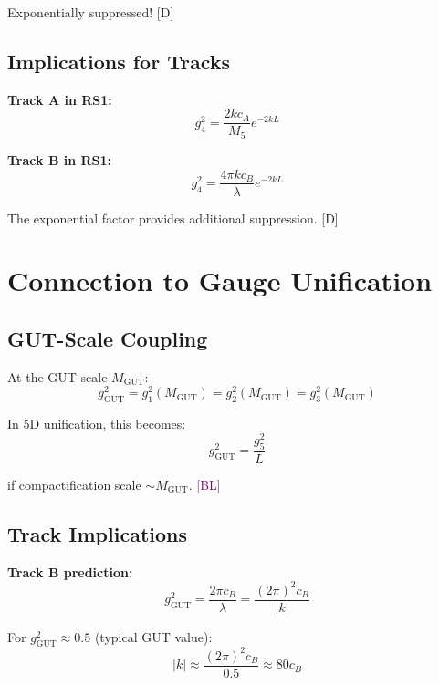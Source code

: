\documentclass[11pt,a4paper]{article}
\newcommand{\tagD}{\textcolor{blue!70!black}{[D]}}
\newcommand{\tagBL}{\textcolor{purple}{[BL]}}
\begin{document}
Exponentially suppressed! \tagD

\subsection{Implications for Tracks}

\textbf{Track A in RS1:}
\begin{equation}
\label{eq:app-track-a-rs}
g_4^2 = \frac{2k c_A}{M_5} e^{-2kL}
\end{equation}

\textbf{Track B in RS1:}
\begin{equation}
\label{eq:app-track-b-rs}
g_4^2 = \frac{4\pi k c_B}{\lambda} e^{-2kL}
\end{equation}

The exponential factor provides additional suppression. \tagD

\section{Connection to Gauge Unification}
\label{app:unification}

\subsection{GUT-Scale Coupling}

At the GUT scale $M_{\text{GUT}}$:
\begin{equation}
\label{eq:app-gut-coupling}
g_{\text{GUT}}^2 = g_1^2(M_{\text{GUT}}) = g_2^2(M_{\text{GUT}}) = g_3^2(M_{\text{GUT}})
\end{equation}

In 5D unification, this becomes:
\begin{equation}
\label{eq:app-5d-unif}
g_{\text{GUT}}^2 = \frac{g_5^2}{L}
\end{equation}

if compactification scale $\sim M_{\text{GUT}}$. \tagBL

\subsection{Track Implications}

\textbf{Track B prediction:}
\begin{equation}
\label{eq:app-track-b-gut}
g_{\text{GUT}}^2 = \frac{2\pi c_B}{\lambda} = \frac{(2\pi)^2 c_B}{|k|}
\end{equation}

For $g_{\text{GUT}}^2 \approx 0.5$ (typical GUT value):
\begin{equation}
\label{eq:app-k-gut}
|k| \approx \frac{(2\pi)^2 c_B}{0.5} \approx 80 c_B
\end{equation}
\end{document}
